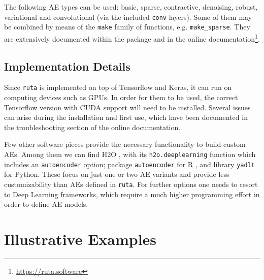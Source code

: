 The following AE types can be used: basic, sparse, contractive, denoising, robust, variational {and convolutional (via the included \texttt{conv} layers)}. Some of them may be combined by means of the \texttt{make} family of functions, e.g. \texttt{make\_sparse}. They are extensively documented within the package and in the online documentation\footnote{\url{https://ruta.software}}.


\subsection{Implementation Details}
\label{p2sec.implementation}

Since \texttt{ruta} is implemented on top of Tensorflow and Keras, it can run on computing devices such as GPUs. In order for them to be used, the correct Tensorflow version with CUDA support will need to be installed. Several issues can arise during the installation and first use, which have been documented in the troubleshooting section of the online documentation.

Few other software pieces provide the necessary functionality to build custom AEs. Among them we can find H2O \cite{h2o}, with its \texttt{h2o.deeplearning} function which includes an \texttt{autoencoder} option; package \texttt{autoencoder} for R \cite{Rautoencoder}, and library \texttt{yadlt} for Python. These focus on just one or two AE variants and provide less customizability than AEs defined in \texttt{ruta}. For further options one needs to resort to Deep Learning frameworks, which require a much higher programming effort in order to define AE models.


\section{Illustrative Examples}
\label{p2sec.examples}


